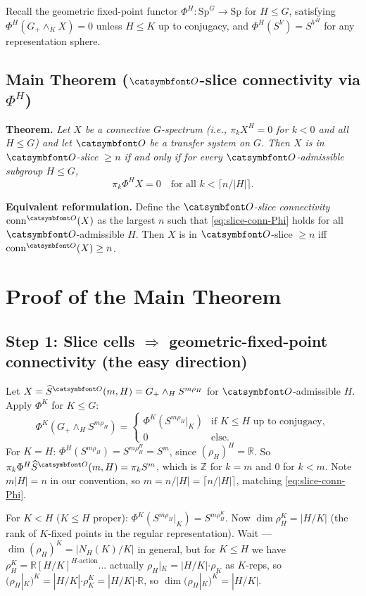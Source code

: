 Recall the geometric fixed-point functor $\Phi^H:\mathrm{Sp}^G\to\mathrm{Sp}$ for $H\le G$, satisfying $\Phi^H(G_+\wedge_K X)=0$ unless $H\le K$ up to conjugacy, and $\Phi^H(S^V)=S^{V^H}$ for any representation sphere.

\subsection*{Main Theorem ($\aO$-slice connectivity via $\Phi^H$)}

\noindent\textbf{Theorem.}  \emph{Let $X$ be a connective $G$-spectrum (i.e., $\pi_kX^H=0$ for $k<0$ and all $H\le G$) and let $\aO$ be a transfer system on $G$.  Then $X$ is in $\aO$-slice $\geq n$ if and only if for every $\aO$-admissible subgroup $H\le G$,
\begin{equation}\label{eq:slice-conn-Phi}
\pi_k\Phi^H X = 0\quad\text{for all }k<\lceil n/|H|\rceil.
\end{equation}}

\medskip
\noindent\textbf{Equivalent reformulation.}  Define the \emph{$\aO$-slice connectivity} $\mathrm{conn}^\aO(X)$ as the largest $n$ such that \eqref{eq:slice-conn-Phi} holds for all $\aO$-admissible $H$.  Then $X$ is in $\aO$-slice $\geq n$ iff $\mathrm{conn}^\aO(X)\geq n$.

\section*{Proof of the Main Theorem}

\subsection*{Step 1: Slice cells $\Rightarrow$ geometric-fixed-point connectivity (the easy direction)}

Let $X=\widehat S^\aO(m,H)=G_+\wedge_H S^{m\rho_H}$ for $\aO$-admissible $H$.  Apply $\Phi^K$ for $K\le G$:
\[
\Phi^K(G_+\wedge_H S^{m\rho_H}) = \begin{cases} \Phi^K(S^{m\rho_H}|_K) & \text{if }K\le H\text{ up to conjugacy},\\ 0 & \text{else}.\end{cases}
\]
For $K=H$: $\Phi^H(S^{m\rho_H})=S^{m\rho_H^H}=S^m$, since $(\rho_H)^H=\mathbb R$.  So $\pi_k\Phi^H\widehat S^\aO(m,H)=\pi_kS^m$, which is $\mathbb Z$ for $k=m$ and $0$ for $k<m$.  Note $m|H|=n$ in our convention, so $m=n/|H|=\lceil n/|H|\rceil$, matching \eqref{eq:slice-conn-Phi}.

For $K<H$ ($K\le H$ proper): $\Phi^K(S^{m\rho_H}|_K)=S^{m\rho_H^K}$.  Now $\dim\rho_H^K=|H/K|$ (the rank of $K$-fixed points in the regular representation).  Wait — $\dim(\rho_H)^K=|N_H(K)/K|$ in general, but for $K\le H$ we have $\rho_H^K=\mathbb R[H/K]^{H\text{-action}}$... actually $\rho_H|_K=|H/K|\cdot\rho_K$ as $K$-reps, so $(\rho_H|_K)^K=|H/K|\cdot\rho_K^K=|H/K|\cdot\mathbb R$, so $\dim(\rho_H|_K)^K=|H/K|$.

